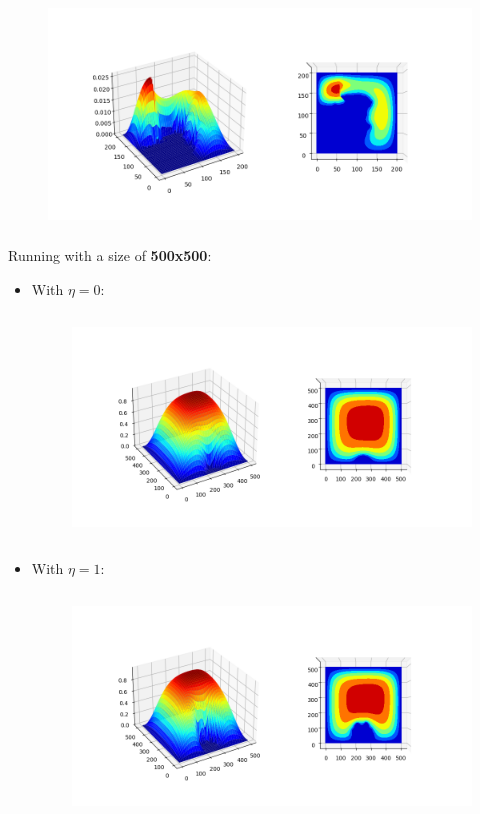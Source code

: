 \documentclass[a4paper,10pt,notitlepage]{article}
\begin{document}
{{{{\begin{itemize}
    \begin{figure}[h]
        \centering
        \includegraphics[trim=70pt 40pt 100pt 60pt, clip, height = 6cm]{200x200p2plot.png}
    \end{figure}
\end{itemize}
\newpage
Running with a size of \textbf{500x500}:
\begin{itemize}
    \item With $\eta = 0$:
    \begin{figure}[h]
        \centering
        \includegraphics[trim=70pt 40pt 100pt 60pt, clip, height = 6cm]{500x500p0plot.png}
    \end{figure}
    \item  With $\eta = 1$:
    \begin{figure}[h]
        \centering
        \includegraphics[trim=70pt 40pt 100pt 60pt, clip, height = 6cm]{500x500p1plot.png}

\end{figure}
\end{itemize}}}}}
\end{document}
